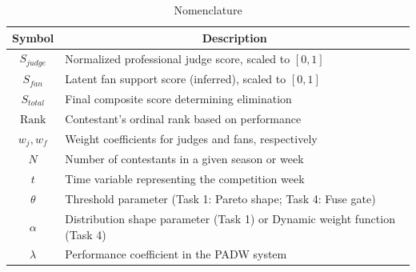 \begin{table}[h]
    \centering
    \caption{Nomenclature}
    \begin{tabular}{cl}
        \toprule
        \textbf{Symbol} & \multicolumn{1}{c}{\textbf{Description}} \\ 
        \midrule
        $S_{judge}$ & Normalized professional judge score, scaled to $[0,1]$ \\
        $S_{fan}$ & Latent fan support score (inferred), scaled to $[0,1]$ \\
        $S_{total}$ & Final composite score determining elimination \\
        $\text{Rank}$ & Contestant's ordinal rank based on performance \\
        $w_{j}, w_{f}$ & Weight coefficients for judges and fans, respectively \\
        $N$ & Number of contestants in a given season or week \\
        $t$ & Time variable representing the competition week \\
        $\theta$ & Threshold parameter (Task 1: Pareto shape; Task 4: Fuse gate) \\
        $\alpha$ & Distribution shape parameter (Task 1) or Dynamic weight function (Task 4) \\
        $\lambda$ & Performance coefficient in the PADW system \\
        \bottomrule
    \end{tabular}
    \label{tab:symbol_table}
\end{table}
